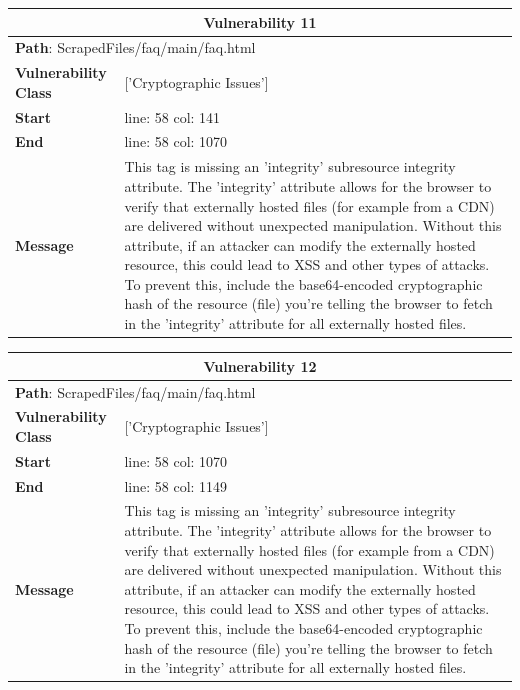 \documentclass[12pt]{article}
\begin{document}
\begin{table}[!h]
\centering
\renewcommand{\arraystretch}{1.3}
\begin{tabular}{|l|p{10cm}|}
\hline
\multicolumn{2}{|c|}{\textbf{Vulnerability 11}} \\
\hline
\multicolumn{2}{|l|}{\textbf{Path}: ScrapedFiles/faq/main/faq.html} \\
\hline
\textbf{Vulnerability Class} & ['Cryptographic Issues'] \\
\hline
\textbf{Start} & line: 58 \quad col: 141 \\
\hline
\textbf{End} & line: 58 \quad col: 1070 \\
\hline
\textbf{Message} & This tag is missing an 'integrity' subresource integrity attribute. The 'integrity' attribute allows for the browser to verify that externally hosted files (for example from a CDN) are delivered without unexpected manipulation. Without this attribute, if an attacker can modify the externally hosted resource, this could lead to XSS and other types of attacks. To prevent this, include the base64-encoded cryptographic hash of the resource (file) you're telling the browser to fetch in the 'integrity' attribute for all externally hosted files. \\
\hline
\end{tabular}
\end{table}
\vspace{0.7cm}
\FloatBarrier
\begin{table}[!h]
\centering
\renewcommand{\arraystretch}{1.3}
\begin{tabular}{|l|p{10cm}|}
\hline
\multicolumn{2}{|c|}{\textbf{Vulnerability 12}} \\
\hline
\multicolumn{2}{|l|}{\textbf{Path}: ScrapedFiles/faq/main/faq.html} \\
\hline
\textbf{Vulnerability Class} & ['Cryptographic Issues'] \\
\hline
\textbf{Start} & line: 58 \quad col: 1070 \\
\hline
\textbf{End} & line: 58 \quad col: 1149 \\
\hline
\textbf{Message} & This tag is missing an 'integrity' subresource integrity attribute. The 'integrity' attribute allows for the browser to verify that externally hosted files (for example from a CDN) are delivered without unexpected manipulation. Without this attribute, if an attacker can modify the externally hosted resource, this could lead to XSS and other types of attacks. To prevent this, include the base64-encoded cryptographic hash of the resource (file) you're telling the browser to fetch in the 'integrity' attribute for all externally hosted files. \\
\hline
\end{tabular}
\end{table}
\end{document}
